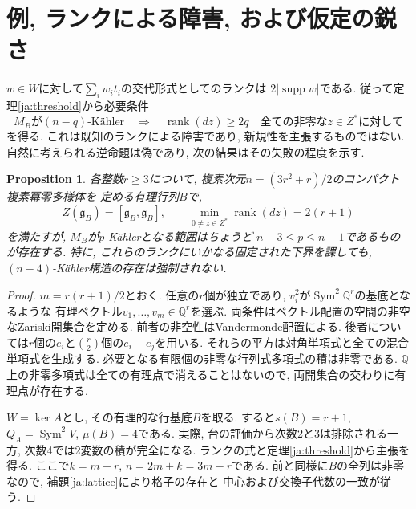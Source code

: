 \documentclass[12pt]{amsart}
\newcommand{\propword}{Proposition}
\newtheorem{prop}[thm]{\propword}
\theoremstyle{definition}
\theoremstyle{remark}
\numberwithin{equation}{section}
\DeclareMathOperator{\Sym}{Sym}
\newcommand{\Q}{\mathbb{Q}}
\begin{document}
\section{例, ランクによる障害, および仮定の鋭さ}
$w\in W$に対して$\sum_i w_i t_i$の交代形式としてのランクは
$2|\operatorname{supp}w|$である. 従って定理\ref{ja:threshold}から必要条件
\begin{equation}\label{ja:rank-bound}
 M_B\text{が}(n-q)\text{-K\"ahler}
 \quad\Longrightarrow\quad
 \operatorname{rank}(dz)\geq2q
 \quad\text{全ての非零な}z\in Z^*\text{に対して}
\end{equation}
を得る. これは既知のランクによる障害であり, 新規性を主張するものではない.
自然に考えられる逆命題は偽であり, 次の結果はその失敗の程度を示す.

\begin{prop}\label{ja:large-rank}
各整数$r\geq3$について, 複素次元$n=(3r^2+r)/2$のコンパクト複素冪零多様体を
定める有理行列$B$で,
\[
 Z(\mathfrak g_B)=[\mathfrak g_B,\mathfrak g_B],\qquad
 \min_{0\ne z\in Z^*}\operatorname{rank}(dz)=2(r+1)
\]
を満たすが, $M_B$が$p$-K\"ahlerとなる範囲はちょうど
$n-3\leq p\leq n-1$であるものが存在する.
特に, これらのランクにいかなる固定された下界を課しても,
$(n-4)$-K\"ahler構造の存在は強制されない.
\end{prop}
\begin{proof}
$m=r(r+1)/2$とおく.
任意の$r$個が独立であり, $v_i^2$が$\Sym^2\Q^r$の基底となるような
有理ベクトル$v_1,\ldots,v_m\in\Q^r$を選ぶ.
両条件はベクトル配置の空間の非空なZariski開集合を定める.
前者の非空性はVandermonde配置による.
後者については$r$個の$e_i$と$\binom r2$個の$e_i+e_j$を用いる.
それらの平方は対角単項式と全ての混合単項式を生成する.
必要となる有限個の非零な行列式多項式の積は非零である.
$\Q$上の非零多項式は全ての有理点で消えることはないので,
両開集合の交わりに有理点が存在する.

$W=\ker A$とし, その有理的な行基底$B$を取る.
すると$s(B)=r+1$, $Q_A=\Sym^2V$, $\mu(B)=4$である.
実際, 台の評価から次数2と3は排除される一方,
次数4では2変数の積が完全になる.
ランクの式と定理\ref{ja:threshold}から主張を得る.
ここで$k=m-r$, $n=2m+k=3m-r$である.
前と同様に$B$の全列は非零なので, 補題\ref{ja:lattice}により格子の存在と
中心および交換子代数の一致が従う.
\end{proof}
\end{document}
